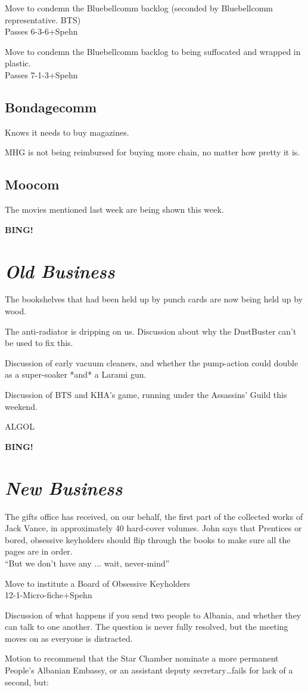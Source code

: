 \documentclass[12pt]{article}
\newcommand{\bing}{{\bf BING!} }
\newcommand{\goto}[1]{\bing \vskip 12pt \section*{{\em{#1}}}}
\begin{document}
Move to condemn the Bluebellcomm backlog (seconded by Bluebellcomm representative.  BTS)\\
Passes 6-3-6+Spehn

Move to condemn the Bluebellcomm backlog to being suffocated and wrapped in
plastic.\\
Passes 7-1-3+Spehn

\subsection*{Bondagecomm}
Knows it needs to buy magazines. 

MHG is not being reimbursed for buying more chain, no matter how
pretty it is.

\subsection*{Moocom}
The movies mentioned last week are being shown this week.

\goto{Old Business}
The bookshelves that had been held up by punch cards are now being held
up by wood. 

The anti-radiator is dripping on us.  Discussion about why the
DustBuster can't be used to fix this.

Discussion of early vacuum cleaners, and whether the pump-action could
double as a super-soaker *and* a Larami gun.

Discussion of BTS and KHA's game, running under the Assassins' Guild
this weekend.

ALGOL

\goto{New Business}
The gifts office has received, on our behalf, the first part of the
collected works of Jack Vance, in approximately 40 hard-cover volumes.
John says that Prentices or bored, obsessive keyholders should flip
through the books to make sure all the pages are in order.\\
``But we don't have any ... wait, never-mind''

Move to institute a Board of Obsessive Keyholders\\
12-1-Micro-fiche+Spehn

Discussion of what happens if you send two people to Albania, and
whether they can talk to one another. The question is never fully
resolved, but the meeting moves on as everyone is distracted.

Motion to recommend that the Star Chamber nominate a more permanent
People's Albanian Embassy, or an assistant deputy secretary\dots fails
for lack of a second, but: 
\end{document}
